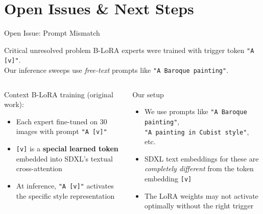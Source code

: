 \documentclass[aspectratio=169,10pt]{beamer}
\begin{document}
\section{Open Issues \& Next Steps}

\begin{frame}[shrink=15]{Open Issue: Prompt Mismatch}
  \begin{alertblock}{Critical unresolved problem}
    B-LoRA experts were trained with trigger token \texttt{"A [v]"}.\\
    Our inference sweeps use \emph{free-text} prompts like \texttt{"A Baroque painting"}.
  \end{alertblock}
  \vspace{0.5em}
  \begin{columns}[T]
      \begin{block}{Context}
        B-LoRA training (original work):
        \begin{itemize}
          \item Each expert fine-tuned on 30 images with prompt \texttt{"A [v]"}
          \item \texttt{[v]} is a \textbf{special learned token} embedded into SDXL's textual cross-attention
          \item At inference, \texttt{"A [v]"} activates the specific style representation
        \end{itemize}
      \end{block}
      \begin{block}{Our setup}
        \begin{itemize}
          \item We use prompts like \texttt{"A Baroque painting"},\\\texttt{"A painting in Cubist style"}, etc.
          \item SDXL text embeddings for these are \emph{completely different} from the token embedding \texttt{[v]}
          \item The LoRA weights may not activate optimally without the right trigger
        \end{itemize}
      \end{block}


\end{columns}
\end{frame}
\end{document}
